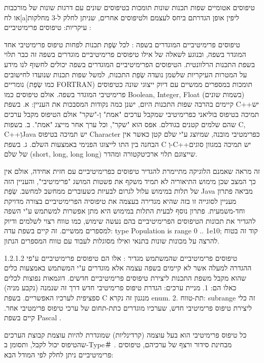       טיפוסים אטומיים
      שפות תכנות שונות תומכות בטיפוסים שונים עם דרגות שונות של מורכבות או לח[a]ליפין אופן הגדרתם ביחס לעצמם ולטיפוסים אחרים, שניתן לחלק ל-3 מחלקות עיקריות:
      טיפוסים פרימיטיביים :

      טיפוסים פרימיטיביים המוגדרים בשפה :
      לכל שְׂפַת תכנות לפחות טיפוס פרימיטיבי אחד המוגדר בשפה, ובנוגע לשאלה של אילו טיפוסים פרימיטיביים מוגדרים בשפה זה כבר תלוי בשפת התכנות הרלוונטית. הטיפוסים הפרימיטיביים המוגדרים בשפה יכולים לחשוף לנו מידע על המטרות העיקריות שלשמן נועדה שְׂפַת התכנות, למשל שפות תכנות שנועדו לחישובים נומריים (כמו שְׂפַת FORTRAN) תומכות במספרים ממשיים עם דיוק ייצוגי שונה כטיפוסים פרימיטיבי המוגדר בשפה.
      אולם טיפוסים כמו Boolean, Integer, Float (בשמות שונים) קיימים בהרבה שפות התכנות היום, ישנן כמה נקודות המסבכות את העניין:
      א. בשפת C++יש תמיכה בטיפוס בוליאני כפרימיטיבי שמקבל ערכים "אמת" וְ-"שקר" אולם הטיפוס מקבל ערכים שהם שלמים קטנים בגודלם. אפס הוא "שקר", וכל ערך אחר מייצג "אמת".
      ב. בשפות C, C++וְJava יש תמיכה בטיפוס Character כפרימטיבי מובנה, שמיוצג ע"י שלם קטן כאשר אין הבחנה בין התו לייצוגו הפנימי באמצעות השלם.
      ג. בשפת C וְ-C++יש תמיכה במגוון סוגים של שלם (short, long, long long) שייצוגם תלוי ארכיטקטורה ומהדר.

      זה מראה שאמנם הלוגיקה מתיימרת להגדיר טיפוסים כפרימיטיביים עם חזית אחידה, אולם אין כך המצב שכן מימוש התיאוריה לא תמיד משקף את פשטות המושג "פרימיטיבי", והעניין הזה של תלות במימוש עלול לגרום לבעיות כשעוברים ממחשב למחשב. שְׂפַת Java מביאה פתרון מעניין לסוגייה זו בזה שהיא מגדירה בעצמה את טיפוסיה הפרימיטיביים בצורה מדויקת וחד-משמעית. פתרון נוסף לבעית התלות במימוש היא מתן אפשרות למשתמש ע"י השפה להגדיר את תכונות הטיפוסים הפרימיטיביים בהם נעשה שימוש, כמו טווח רצוי לשלמים ודיוק למספרים ממשיים. זה קיים בשפת עדה:
      type Population is range 0 .. 1e10;
      קוד זה בטוח להרצה על מכונות שונות בתנאי ואילו מסוגלות לעבוד עם טווח המספרים הנתון.

      1.2.1.2 טיפוסים פרימיטיביים שהמשתמש מגדיר :
      אלו הם טיפוסים פרימיטיביים ע"פי ההגדרה למעלה אשר לא קיימים בשפה עצמה אלא
      מוגדרים ע"י המשתמש באמצעות כלים שהוא מקבל משפת התכנות ליצירת טיפוסים
      פרימיטיביים חדשים. דוגמאות נפוצות לכלים כאלו הם:
      1. מניית ערכים: הגדרת טיפוס פרימיטיבי חדש דרך זה שנמנה (נקבע מניה) ספציפית לערכיו האפשריים. בשפת C מנגנון זה נקרא enum.
      2. תת-טווח: subrange זה כלי ליצירת טיפוס פרימיטיבי חדש, שערכיו מוגדרים כתת-תחום של ערכי טיפוס פרימטיבי אחר. קיים בשפת Pascal .

      כל טיפוס פרימיטיבי הוא בעל עוצמה (קרדינליות) שמוגדרת להיות עוצמת קבוצת הערכים שהטיפוס יכול לקבל, ותסומן ב-Type＃ .
      מבחינת סידור ורצף של ערכיהם, טיפוסים פרימיטיביים ניתן לחלק לפי המודל הבא:

